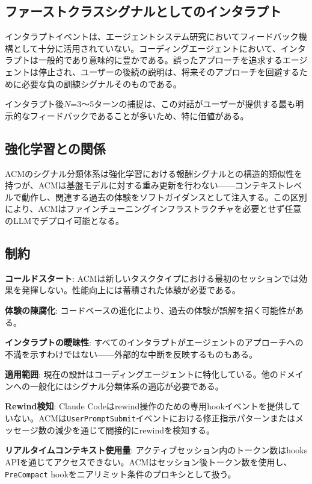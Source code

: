 \documentclass[conference]{IEEEtran}
\begin{document}
\subsection{ファーストクラスシグナルとしてのインタラプト}

インタラプトイベントは、エージェントシステム研究においてフィードバック機構として十分に活用されていない。コーディングエージェントにおいて、インタラプトは一般的であり意味的に豊かである。誤ったアプローチを追求するエージェントは停止され、ユーザーの後続の説明は、将来そのアプローチを回避するために必要な負の訓練シグナルそのものである。

インタラプト後$N$=3〜5ターンの捕捉は、この対話がユーザーが提供する最も明示的なフィードバックであることが多いため、特に価値がある。

\subsection{強化学習との関係}

ACMのシグナル分類体系は強化学習における報酬シグナルとの構造的類似性を持つが、ACMは基盤モデルに対する重み更新を行わない——コンテキストレベルで動作し、関連する過去の体験をソフトガイダンスとして注入する。この区別により、ACMはファインチューニングインフラストラクチャを必要とせず任意のLLMでデプロイ可能となる。

\subsection{制約}

\textbf{コールドスタート}: ACMは新しいタスクタイプにおける最初のセッションでは効果を発揮しない。性能向上には蓄積された体験が必要である。

\textbf{体験の陳腐化}: コードベースの進化により、過去の体験が誤解を招く可能性がある。

\textbf{インタラプトの曖昧性}: すべてのインタラプトがエージェントのアプローチへの不満を示すわけではない——外部的な中断を反映するものもある。

\textbf{適用範囲}: 現在の設計はコーディングエージェントに特化している。他のドメインへの一般化にはシグナル分類体系の適応が必要である。

\textbf{Rewind検知}: Claude Codeはrewind操作のための専用hookイベントを提供していない。ACMは\texttt{UserPromptSubmit}イベントにおける修正指示パターンまたはメッセージ数の減少を通じて間接的にrewindを検知する。

\textbf{リアルタイムコンテキスト使用量}: アクティブセッション内のトークン数はhooks APIを通じてアクセスできない。ACMはセッション後トークン数を使用し、\texttt{PreCompact} hookをニアリミット条件のプロキシとして扱う。
\end{document}

